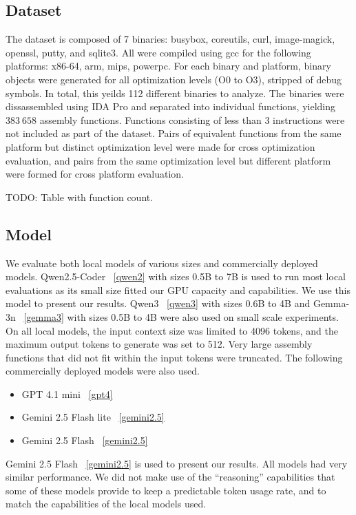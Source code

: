 \documentclass[conference,compsoc]{IEEEtran}
\begin{document}
\subsection{Dataset}

The dataset is composed of 7 binaries: busybox, coreutils, curl, image-magick, openssl, putty, and sqlite3.
All were compiled using gcc for the following platforms: x86-64, arm, mips, powerpc.
For each binary and platform, binary objects were generated for all optimization levels (O0 to O3),
stripped of debug symbols. In total, this yeilds 112 different binaries to analyze.
The binaries were dissassembled using IDA Pro and separated into individual functions, yielding \(383\ 658\) assembly functions.
Functions consisting of less than 3 instructions were not included as part of the dataset.
Pairs of equivalent functions from the same platform but distinct optimization level were made for cross optimization
evaluation, and pairs from the same optimization level but different platform were formed for cross
platform evaluation.

TODO: Table with function count.

\subsection{Model}

We evaluate both local models of various sizes and commercially deployed models.
Qwen2.5-Coder ~\ref{qwen2} with sizes 0.5B to 7B is used to run most local evaluations as its small size fitted our GPU capacity and capabilities.
We use this model to present our results. Qwen3 ~\ref{qwen3} with sizes 0.6B to 4B and Gemma-3n ~\ref{gemma3} with sizes 0.5B to 4B were also used on
small scale experiments. On all local models, the input context size was limited to 4096 tokens, and the maximum output tokens to generate
was set to 512. Very large assembly functions that did not fit within the input tokens were truncated. The following commercially deployed
models were also used.

\begin{itemize}
    \item GPT 4.1 mini ~\ref{gpt4}
    \item Gemini 2.5 Flash lite ~\ref{gemini2.5}
    \item Gemini 2.5 Flash ~\ref{gemini2.5}
\end{itemize}

Gemini 2.5 Flash ~\ref{gemini2.5} is used to present our results. All models had very similar performance. We did not make use of the ``reasoning''
capabilities that some of these models provide to keep a predictable token usage rate, and to match the capabilities of the local models used.
\end{document}
